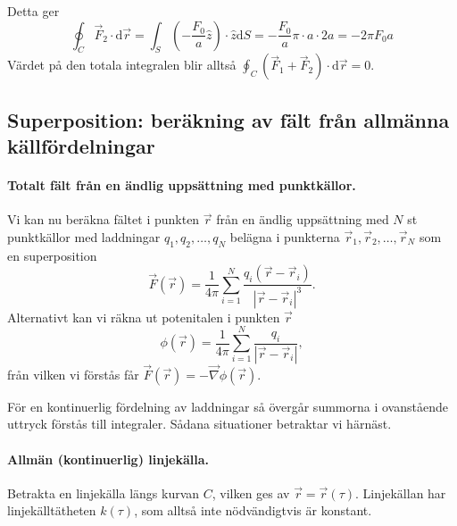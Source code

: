 \documentclass[%
oneside,                 %
final,                   %
10pt]{article}
\newenvironment{notice_mdfboxadmon}[1][]{
\begin{notice_mdfboxmdframed}[frametitle=#1]
}
{
\end{notice_mdfboxmdframed}
}
\begin{document}
\begin{notice_mdfboxadmon}[Exempel: 6.3]
Detta ger 
\begin{equation}
\oint_C \vec{F}_2 \cdot \mbox{d}\vec{r} = \int_S \left( - \frac{F_0}{a}\hat z \right) \cdot \hat{z} \mbox{d}S = - \frac{F_0}{a} \pi \cdot a \cdot 2a = - 2 \pi F_0 a
\end{equation}
Värdet på den totala integralen blir alltså $\oint_C (\vec{F}_1 + \vec{F}_2) \cdot \mbox{d}\vec{r} = 0$.
\end{notice_mdfboxadmon} %



\subsection*{Superposition: beräkning av fält från allmänna källfördelningar}

\paragraph{Totalt fält från en ändlig uppsättning med punktkällor.}
Vi kan nu beräkna fältet i punkten $\vec{r}$ från en ändlig uppsättning med $N$ st punktkällor med laddningar $q_1, q_2, \ldots, q_N$ belägna i punkterna $\vec{r}_1, \vec{r}_2, \ldots, \vec{r}_N$ som en superposition
\begin{equation}
\vec{F}(\vec{r}) = \frac{1}{4\pi} \sum_{i=1}^N \frac{q_i \left( \vec{r} - \vec{r}_i \right)}{\left| \vec{r} - \vec{r}_i \right|^3}.
\end{equation}
Alternativt kan vi räkna ut potenitalen i punkten $\vec{r}$
\begin{equation}
\phi(\vec{r}) = \frac{1}{4\pi} \sum_{i=1}^N \frac{q_i}{\left| \vec{r} - \vec{r}_i \right|},
\end{equation}
från vilken vi förstås får $\vec{F}(\vec{r}) = -\vec{\nabla}\phi(\vec{r})$. 

För en kontinuerlig fördelning av laddningar så övergår summorna i ovanstående uttryck förstås till integraler. Sådana situationer betraktar vi härnäst.

\paragraph{Allmän (kontinuerlig) linjekälla.}
Betrakta en linjekälla längs kurvan $C$, vilken ges av $\vec{r} = \vec{r}(\tau)$. Linjekällan har linjekälltätheten $k(\tau)$, som alltså inte nödvändigtvis är konstant.
\end{document}

